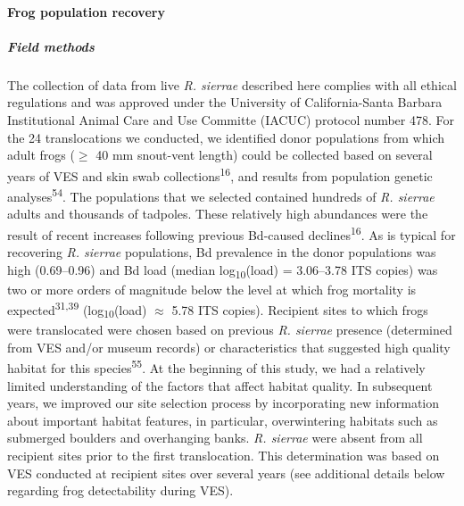 \documentclass[
  letterpaper,
  DIV=11,
  numbers=noendperiod]{scrartcl}
\let\oldparagraph\paragraph
\renewcommand{\paragraph}[1]{\oldparagraph{#1}\mbox{}}
\let\oldsubparagraph\subparagraph
\renewcommand{\subparagraph}[1]{\oldsubparagraph{#1}\mbox{}}
\begin{document}
\paragraph{Frog population recovery}\label{frog-population-recovery-1}

\subparagraph{Field methods}\label{field-methods}

The collection of data from live \emph{R. sierrae} described here
complies with all ethical regulations and was approved under the
University of California-Santa Barbara Institutional Animal Care and Use
Committe (IACUC) protocol number 478. For the 24 translocations we
conducted, we identified donor populations from which adult frogs
(\(\geq\) 40 mm snout-vent length) could be collected based on several
years of VES and skin swab collections\textsuperscript{16}, and results
from population genetic analyses\textsuperscript{54}. The populations
that we selected contained hundreds of \emph{R. sierrae} adults and
thousands of tadpoles. These relatively high abundances were the result
of recent increases following previous Bd-caused
declines\textsuperscript{16}. As is typical for recovering \emph{R.
sierrae} populations, Bd prevalence in the donor populations was high
(0.69--0.96) and Bd load (median log\textsubscript{10}(load) =
3.06--3.78 ITS copies) was two or more orders of magnitude below the
level at which frog mortality is expected\textsuperscript{31,39}
(log\textsubscript{10}(load) \(\approx\) 5.78 ITS copies). Recipient
sites to which frogs were translocated were chosen based on previous
\emph{R. sierrae} presence (determined from VES and/or museum records)
or characteristics that suggested high quality habitat for this
species\textsuperscript{55}. At the beginning of this study, we had a
relatively limited understanding of the factors that affect habitat
quality. In subsequent years, we improved our site selection process by
incorporating new information about important habitat features, in
particular, overwintering habitats such as submerged boulders and
overhanging banks. \emph{R. sierrae} were absent from all recipient
sites prior to the first translocation. This determination was based on
VES conducted at recipient sites over several years (see additional
details below regarding frog detectability during VES).
\end{document}
